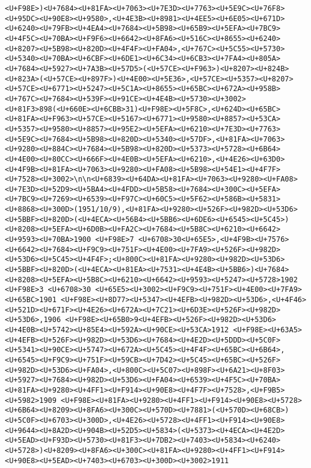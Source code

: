 \documentclass[
]{article}
\begin{document}
\begin{verbatim}
<U+F98E>)<U+7684><U+81FA><U+7063><U+7E3D><U+7763><U+5E9C><U+76F8><U+95DC><U+90E8><U+9580>,<U+4E3B><U+8981><U+4EE5><U+6E05><U+671D><U+6240><U+79FB><U+4EA4><U+7684><U+5B98><U+65B9><U+5EFA><U+7BC9><U+4F5C><U+70BA><U+F9F6><U+6642><U+8FA6><U+516C><U+8655><U+6240><U+8207><U+5B98><U+820D><U+4F4F><U+FA04>,<U+767C><U+5C55><U+5730><U+5340><U+70BA><U+6CBF><U+6DE1><U+6C34><U+6CB3><U+7FA4><U+805A><U+7684><U+5927><U+7A3B><U+57D5>(<U+57CE><U+F963>)<U+8207><U+824B><U+823A>(<U+57CE><U+897F>)<U+4E00><U+5E36>,<U+57CE><U+5357><U+8207><U+57CE><U+6771><U+5247><U+5C1A><U+8655><U+65BC><U+672A><U+958B><U+767C><U+7684><U+539F><U+91CE><U+4E4B><U+5730><U+3002><U+81F3>898(<U+660E><U+6CBB>31)<U+F98E><U+5F8C>,<U+624D><U+65BC><U+81FA><U+F963><U+57CE><U+5167><U+6771><U+9580><U+8857><U+53CA><U+5357><U+9580><U+8857><U+95E2><U+5EFA><U+6210><U+7E3D><U+7763><U+5E9C><U+7684><U+5B98><U+820D><U+5340><U+57DF>,<U+81FA><U+7063><U+9280><U+884C><U+7684><U+5B98><U+820D><U+5373><U+5728><U+6B64><U+4E00><U+80CC><U+666F><U+4E0B><U+5EFA><U+6210>,<U+4E26><U+63D0><U+4F9B><U+81FA><U+7063><U+9280><U+FA08><U+5B98><U+54E1><U+4F7F><U+7528><U+3002>\n\n<U+6839><U+64DA><U+81FA><U+7063><U+9280><U+FA08><U+7E3D><U+52D9><U+5BA4><U+4FDD><U+5B58><U+7684><U+300C><U+5EFA><U+7BC9><U+7269><U+6539><U+F97C><U+60C5><U+5F62><U+586B><U+5831><U+8868><U+300D>(1951/10/9),<U+81FA><U+9280><U+526F><U+982D><U+53D6><U+5BBF><U+820D>(<U+4ECA><U+56B4><U+5BB6><U+6DE6><U+6545><U+5C45>)<U+8208><U+5EFA><U+6D0B><U+FA2C><U+7684><U+5B8C><U+6210><U+6642><U+9593><U+70BA>1900 <U+F98E>7 <U+6708>30<U+65E5>,<U+4F9B><U+7576><U+6642><U+7684><U+F9C9><U+751F><U+4E00><U+7FA9><U+526F><U+982D><U+53D6><U+5C45><U+4F4F>;<U+800C><U+81FA><U+9280><U+982D><U+53D6><U+5BBF><U+820D>(<U+4ECA><U+81EA><U+7531><U+4E4B><U+5BB6>)<U+7684><U+8208><U+5EFA><U+5B8C><U+6210><U+6642><U+9593><U+5247><U+5728>1902 <U+F98E>3 <U+6708>30 <U+65E5><U+3002><U+F9C9><U+751F><U+4E00><U+7FA9><U+65BC>1901 <U+F98E><U+8D77><U+5347><U+4EFB><U+982D><U+53D6>,<U+4F46><U+521D><U+671F><U+4E26><U+672A><U+7C21><U+6D3E><U+526F><U+982D><U+53D6>,1906 <U+F98E><U+65B0>9<U+4EFB><U+526F><U+982D><U+53D6><U+4E0B><U+5742><U+85E4><U+592A><U+90CE><U+53CA>1912 <U+F98E><U+63A5><U+4EFB><U+526F><U+982D><U+53D6><U+7684><U+4E2D><U+5DDD><U+5C0F><U+5341><U+90CE><U+5747><U+672A><U+5C45><U+4F4F><U+65BC><U+6B64>,<U+6545><U+F9C9><U+751F><U+59CB><U+7D42><U+5C45><U+65BC><U+526F><U+982D><U+53D6><U+FA04>,<U+800C><U+5C07><U+898F><U+6A21><U+8F03><U+5927><U+7684><U+982D><U+53D6><U+FA04><U+6539><U+4F5C><U+70BA><U+81FA><U+9280><U+4FF1><U+F914><U+90E8><U+4F7F><U+7528>,<U+F9B5><U+5982>1909 <U+F98E><U+81FA><U+9280><U+4FF1><U+F914><U+90E8><U+5728><U+6B64><U+8209><U+8FA6><U+300C><U+570D><U+7881>(<U+570D><U+68CB>)<U+5C0F><U+6703><U+300D>,<U+4E26><U+5728><U+4FF1><U+F914><U+90E8><U+9644><U+8A2D><U+904B><U+52D5><U+5834>(<U+5373><U+4ECA><U+4E2D><U+5EAD><U+F93D><U+5730><U+81F3><U+7DB2><U+7403><U+5834><U+6240><U+5728>)<U+8209><U+8FA6><U+300C><U+81FA><U+9280><U+4FF1><U+F914><U+90E8><U+5EAD><U+7403><U+6703><U+300D><U+3002>1911 
\end{verbatim}
\end{document}
